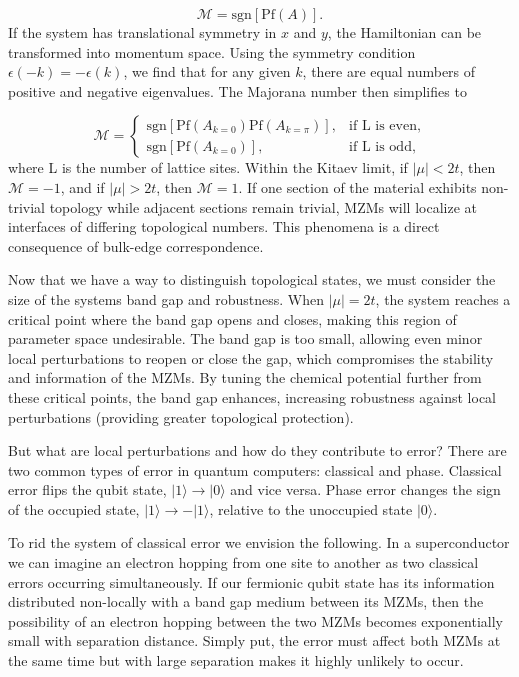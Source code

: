 \begin{equation}
  \mathcal{M} = \text{sgn} [\text{Pf} (A)].
\end{equation}
If the system has translational symmetry in $x$ and $y$, the Hamiltonian can be transformed into momentum space.
Using the symmetry condition $\epsilon(-k) = -\epsilon(k)$, we find that for any given $k$, there are equal numbers of positive and negative eigenvalues.
The Majorana number then simplifies to

\begin{equation}
  \mathcal{M} =
  \begin{cases}
    \text{sgn} [\text{Pf} (A_{k=0}) \text{Pf} (A_{k=\pi})], &\text{if L is even}, \\
    \text{sgn} [\text{Pf} (A_{k=0})], &\text{if L is odd},
  \end{cases}
\end{equation}
where L is the number of lattice sites.
Within the Kitaev limit, if $|\mu|< 2t$, then $\mathcal{M} = -1$, and if $|\mu| > 2t$, then $\mathcal{M} = 1$.
If one section of the material exhibits non-trivial topology while adjacent sections remain trivial, MZMs will localize at interfaces of differing topological numbers.
This phenomena is a direct consequence of bulk-edge correspondence.

Now that we have a way to distinguish topological states, we must consider the size of the systems band gap and robustness.
When $|\mu| = 2t$, the system reaches a critical point where the band gap opens and closes, making this region of parameter space undesirable.
The band gap is too small, allowing even minor local perturbations to reopen or close the gap, which compromises the stability and information of the MZMs.
By tuning the chemical potential further from these critical points, the band gap enhances, increasing robustness against local perturbations (providing greater topological protection).


But what are local perturbations and how do they contribute to error?
There are two common types of error in quantum computers: classical and phase.
Classical error flips the qubit state, $|1\rangle \rightarrow |0\rangle$ and vice versa.
Phase error changes the sign of the occupied state, $|1\rangle \rightarrow -|1\rangle$, relative to the unoccupied state $|0\rangle$.

To rid the system of classical error we envision the following.
In a superconductor we can imagine an electron hopping from one site to another as two classical errors occurring simultaneously.
If our fermionic qubit state has its information distributed non-locally with a band gap medium between its MZMs, then the possibility of an electron hopping between the two MZMs becomes exponentially small with separation distance.
Simply put, the error must affect both MZMs at the same time but with large separation makes it highly unlikely to occur.

